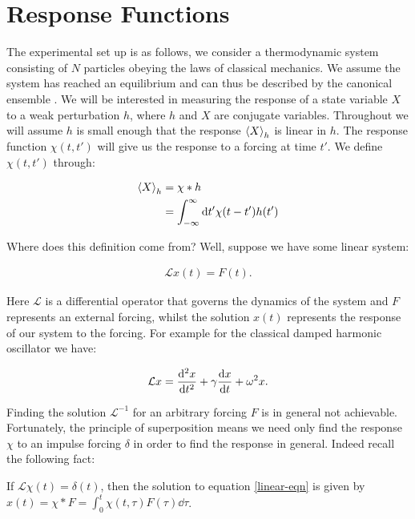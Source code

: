 
\section{Response Functions} \label{section: Response Functions}

The experimental set up is as follows, we consider a thermodynamic system consisting of $N$ particles obeying the laws of classical mechanics. We assume the system has reached an equilibrium and can thus be described by the canonical ensemble \cite{Greiner1995}. We will be interested in measuring the response of a state variable $X$ to a weak perturbation $h$, where $h$ and $X$ are conjugate variables. Throughout we will assume $h$ is small enough that the response $\expval{X}_h$ is linear in $h$. The response function $\chi(t, t')$ will give us the response to a forcing at time $t'$. We define $\chi(t, t')$ through:

\begin{align} 
\expval{X}_h &= \chi * h\\ \label{ChiDef}
&= \int_{- \infty}^{\infty} \dd t' \chi(t - t') h(t')
\end{align}

\noindent Where does this definition come from? Well, suppose we have some linear system: 

\begin{align}
\mathcal{L}x(t) = F(t). \label{linear-eqn}
\end{align}

\noindent Here $\mathcal{L}$ is a differential operator that governs the dynamics of the system and $F$ represents an external forcing, whilst the solution $x(t)$ represents the response of our system to the forcing. For example for the classical damped harmonic oscillator we have:

\begin{align*}
\mathcal{L} x = \dv[2]{x}{t} + \gamma \dv{x}{t} + \omega ^2 x.
\end{align*} 

\noindent Finding the solution $\mathcal{L}^{-1}$ for an arbitrary forcing $F$ is in general not achievable. Fortunately, the principle of superposition means we need only find the response $\chi$ to an impulse forcing $\delta$ in order to find the response in general. Indeed recall the following fact:

\begin{thm}
If $\mathcal{L}\chi(t) = \delta(t)$, then the solution to equation \ref{linear-eqn} is given by $x(t) = \chi * F = \int_0^t \chi(t, \tau) F(\tau) \dd \tau$.
\end{thm}

